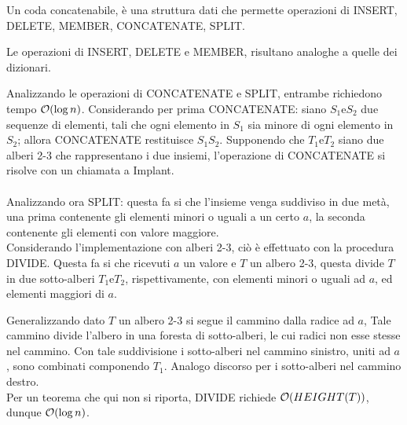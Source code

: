 \documentclass{subfiles}
\begin{document}
Un coda concatenabile, è una struttura dati che permette operazioni di INSERT, DELETE, MEMBER, CONCATENATE, SPLIT.

\begin{Remark*}
    Le operazioni di INSERT, DELETE e MEMBER, risultano analoghe a quelle dei dizionari.
\end{Remark*}

\noindent Analizzando le operazioni di CONCATENATE e SPLIT, entrambe richiedono tempo \(\order{\log n}\).
Considerando per prima CONCATENATE: siano \(S_{1} \text{e} S_{2}\) due sequenze di elementi, tali che ogni elemento in \(S_{1}\) sia minore di ogni elemento in \(S_{2}\);
allora CONCATENATE restituisce \(S_{1}S_{2}\). Supponendo che \(T_{1} \text{e} T_{2}\) siano due alberi 2-3 che rappresentano i due insiemi,
l'operazione di CONCATENATE si risolve con un chiamata a Implant.
\\ \\
Analizzando ora SPLIT: questa fa si che l'insieme venga suddiviso in due metà, una prima contenente gli elementi minori o uguali a un certo \(a\),
la seconda contenente gli elementi con valore maggiore.
\\
Considerando l'implementazione con alberi 2-3, ciò è effettuato con la procedura DIVIDE. Questa fa si che ricevuti \(a\) un valore e \(T\) un albero 2-3,
questa divide \(T\) in due sotto-alberi \(T_{1} \text{e} T_{2}\), rispettivamente, con elementi minori o uguali ad \(a\), ed elementi maggiori di \(a\).


\noindent Generalizzando dato \(T\) un albero 2-3 si segue il cammino dalla radice ad \(a\), Tale cammino divide l'albero in una foresta di sotto-alberi,
le cui radici non esse stesse nel cammino. Con tale suddivisione i sotto-alberi nel cammino sinistro, uniti ad \(a\), sono combinati componendo \(T_{1}\).
Analogo discorso per i sotto-alberi nel cammino destro.
\\
Per un teorema che qui non si riporta, DIVIDE richiede \(\order{HEIGHT(T)}\), dunque \(\order{\log n}\).
\end{document}
